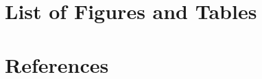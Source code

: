 \documentclass{ecsgdp}
\makeatletter
\renewcommand\listoftables{\@starttoc{lot}}
\let\listoftableandfigures\listoftables
\makeatother
\begin{document}
\begin{table}[H]
\begin{tabularx}{\textwidth}{|l|X|}
    \hline
  \end{tabularx}
  \end{table}

  \clearpage
  
  \chapter*{List of Figures and Tables}
  \label{sec:list-of-figures-and-tables}
  \listoftableandfigures
  \clearpage

  \setcounter{page}{1}
  
  
  
  
  
  
  
  
  

  \setcounter{secnumdepth}{-1}
  \chapter*{References}
  \label{sec:references}
  \printbibliography[heading=none]
  \clearpage

  
\end{document}
